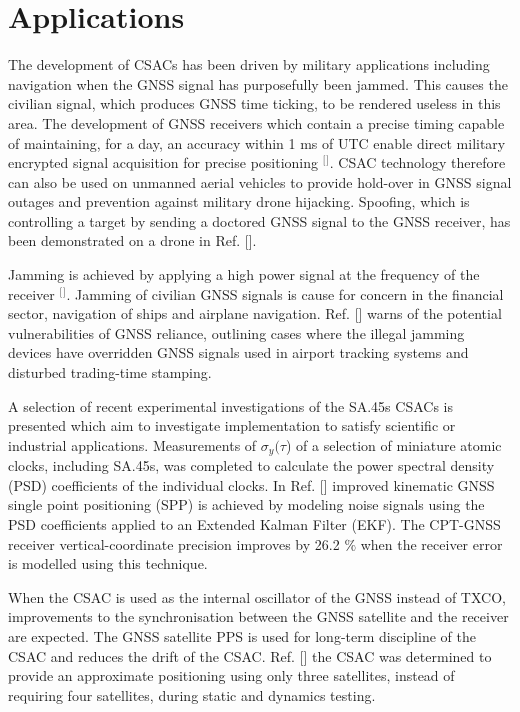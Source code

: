 \section{\label{sec:level1}Applications}
The development of CSACs has been driven by military applications including navigation when the GNSS signal has purposefully been jammed. This causes the civilian signal, which produces GNSS time ticking, to be rendered useless in this area. The development of GNSS receivers which contain a precise timing capable of maintaining, for a day, an accuracy within 1 ms of UTC enable direct military encrypted signal acquisition for precise positioning $^[$\citep{Fruehauf2001FastClock.}$^]$. CSAC technology therefore can also be used on unmanned aerial vehicles to provide hold-over in GNSS signal outages and prevention against military drone hijacking. Spoofing, which is controlling a target by sending a doctored GNSS signal to the GNSS receiver, has been demonstrated on a drone in Ref. []. 

Jamming is achieved by applying a high power signal at the frequency of the receiver $^[$\citep{article}$^]$. Jamming of civilian GNSS signals is cause for concern in the financial sector, navigation of ships and airplane navigation. Ref. [] warns of the potential vulnerabilities of GNSS reliance, outlining cases where the illegal jamming devices have overridden GNSS signals used in airport tracking systems and disturbed trading-time stamping.

A selection of recent experimental investigations of the SA.45s CSACs is presented which aim to investigate implementation to satisfy scientific or industrial applications. Measurements of $\sigma_{y}(\tau$) of a selection of miniature atomic clocks, including SA.45s, was completed to calculate the power spectral density (PSD) coefficients of the individual clocks. In Ref. [] improved kinematic GNSS single point positioning (SPP) is achieved by modeling noise signals using the PSD coefficients applied to an Extended Kalman Filter (EKF). The CPT-GNSS receiver vertical-coordinate precision improves by 26.2 $\%$ when the receiver error is modelled using this technique.  
 
When the CSAC is used as the internal oscillator of the GNSS instead of TXCO, improvements to the synchronisation between the GNSS satellite and the receiver are expected. The GNSS satellite PPS is used for long-term discipline of the CSAC and reduces the drift of the CSAC. Ref. [] the CSAC was determined to provide an approximate positioning using only three satellites, instead of requiring four satellites, during static and dynamics testing. 

